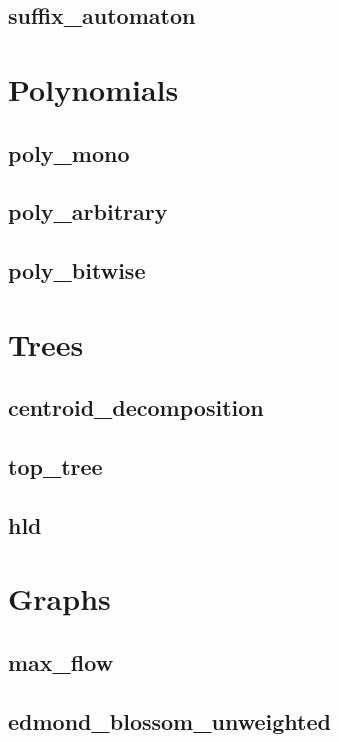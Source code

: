 \documentclass[a4paper, twocolumn]{article}
\begin{document}
\subsection{suffix\_automaton}

\section{Polynomials}
\subsection{poly\_mono}

\subsection{poly\_arbitrary}

\subsection{poly\_bitwise}

\section{Trees}
\subsection{centroid\_decomposition}

\subsection{top\_tree}

\subsection{hld}

\section{Graphs}
\subsection{max\_flow}

\subsection{edmond\_blossom\_unweighted}

\end{document}
